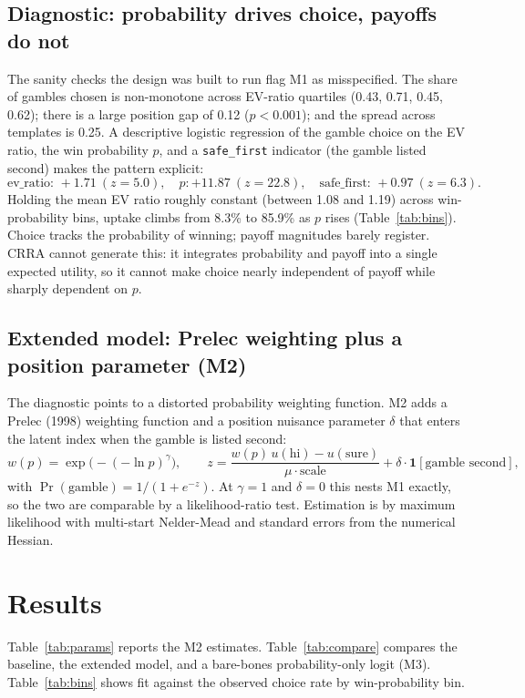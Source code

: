 \documentclass[11pt]{article}
\begin{document}
\subsection{Diagnostic: probability drives choice, payoffs do not}
The sanity checks the design was built to run flag M1 as misspecified. The share of gambles chosen is
non-monotone across EV-ratio quartiles (0.43, 0.71, 0.45, 0.62); there is a large position gap of
0.12 ($p < 0.001$); and the spread across templates is 0.25. A descriptive logistic regression of the
gamble choice on the EV ratio, the win probability $p$, and a \texttt{safe\_first} indicator (the
gamble listed second) makes the pattern explicit:
\[
  \text{ev\_ratio: } +1.71\ (z=5.0), \quad p: +11.87\ (z=22.8), \quad \text{safe\_first: } +0.97\ (z=6.3).
\]
Holding the mean EV ratio roughly constant (between 1.08 and 1.19) across win-probability bins, uptake
climbs from 8.3\% to 85.9\% as $p$ rises (Table~\ref{tab:bins}). Choice tracks the probability of
winning; payoff magnitudes barely register. CRRA cannot generate this: it integrates probability and
payoff into a single expected utility, so it cannot make choice nearly independent of payoff while
sharply dependent on $p$.

\subsection{Extended model: Prelec weighting plus a position parameter (M2)}
The diagnostic points to a distorted probability weighting function. M2 adds a Prelec (1998) weighting
function and a position nuisance parameter $\delta$ that enters the latent index when the gamble is
listed second:
\[
  w(p) = \exp\!\big(-(-\ln p)^{\gamma}\big), \qquad
  z = \frac{w(p)\,u(\text{hi}) - u(\text{sure})}{\mu \cdot \text{scale}} + \delta \cdot \mathbf{1}[\text{gamble second}],
\]
with $\Pr(\text{gamble}) = 1/(1 + e^{-z})$. At $\gamma = 1$ and $\delta = 0$ this nests M1 exactly, so
the two are comparable by a likelihood-ratio test. Estimation is by maximum likelihood with
multi-start Nelder-Mead and standard errors from the numerical Hessian.

\section{Results}

Table~\ref{tab:params} reports the M2 estimates. Table~\ref{tab:compare} compares the baseline, the
extended model, and a bare-bones probability-only logit (M3). Table~\ref{tab:bins} shows fit against
the observed choice rate by win-probability bin.
\end{document}
